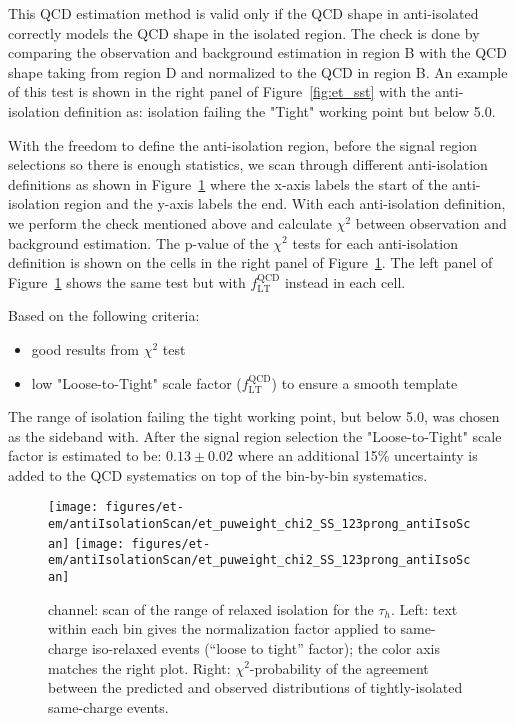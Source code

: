 This QCD estimation method is valid only if the QCD shape in
anti-isolated correctly models the QCD shape in the isolated
region. The check is done by comparing the observation and background
estimation in region B with the QCD shape taking from region D and
normalized to the QCD in region B.  An example of this test is shown
in the right panel of Figure~\ref{fig:et_sst} with the anti-isolation
definition as: \tauh isolation failing the "Tight" working point but
below 5.0\gev.

With the freedom to define the \tauh anti-isolation region, before the 
signal region selections so there is enough statistics, we scan 
through different anti-isolation definitions as shown in Figure~\ref{fig:et_scans} 
where the x-axis labels the start of the anti-isolation region and the 
y-axis labels the end. With each anti-isolation definition, we perform 
the check mentioned above and calculate $\chi^2$ between observation 
and background estimation. The p-value of the $\chi^2$ tests for each 
anti-isolation definition is shown on the cells in the right panel 
of Figure~\ref{fig:et_scans}. The left panel of Figure~\ref{fig:et_scans} shows 
the same test but with $f_\mathrm{LT}^\mathrm{QCD}$ instead in each cell.

Based on the following criteria:
\begin{itemize}
  \item good results from $\chi^2$ test
  \item low "Loose-to-Tight" scale factor ($f_\mathrm{LT}^\mathrm{QCD}$) to ensure a smooth template
\end{itemize}

The range of isolation failing the tight working point, but below 5.0\gev, was chosen as the
sideband with. After the signal region selection the "Loose-to-Tight" scale factor is estimated
to be: $0.13 \pm 0.02$ where an additional 15\% uncertainty is added to the QCD systematics 
on top of the bin-by-bin systematics.

\begin{figure}\centering
  \texttt{[image: figures/et-em/antiIsolationScan/et\_puweight\_chi2\_SS\_123prong\_antiIsoScan]} %
  \texttt{[image: figures/et-em/antiIsolationScan/et\_puweight\_chi2\_SS\_123prong\_antiIsoScan]} %
  \caption{\label{fig:et_scans} \teth channel: scan of the range of
    relaxed isolation for the $\tau_h$.  Left: text within each bin
    gives the normalization factor applied to same-charge iso-relaxed
    events (``loose to tight'' factor); the color axis matches the
    right plot.  Right: $\chi^2$-probability of the agreement between
    the predicted and observed distributions of tightly-isolated
    same-charge events.}
\end{figure}

